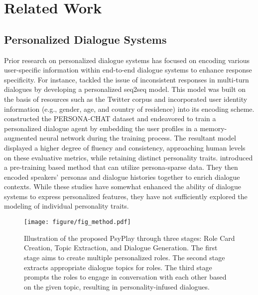\section{Related Work}
\subsection{Personalized Dialogue Systems}
Prior research on personalized dialogue systems has focused on encoding various user-specific information within end-to-end dialogue systems to enhance response specificity. For instance, \citet{li2016persona} tackled the issue of inconsistent responses in multi-turn dialogues by developing a personalized seq2seq %
model. This model was built on the basis of resources such as the Twitter corpus and incorporated user identity information (e.g., gender, age, and country of residence) into its encoding scheme. \citet{zhang2018personalizing} constructed the PERSONA-CHAT dataset and endeavored to train a personalized dialogue agent by embedding the user profiles in a memory-augmented neural network \cite{sukhbaatar2015end} during the training process. The resultant model displayed a higher degree of fluency and consistency, approaching human levels on these evaluative metrics, while retaining distinct personality traits. \citet{zheng2020pre} introduced a pre-training based method that can utilize persona-sparse data. They then encoded speakers’ personas and dialogue histories together to enrich dialogue contexts. While these studies have somewhat enhanced the ability of dialogue systems to express personalized features, they have not sufficiently explored the modeling of individual personality traits.

\begin{figure*}[t]
	\centering
	\texttt{[image: figure/fig\_method.pdf]}
	\caption{Illustration of the proposed PsyPlay through three stages: Role Card Creation, Topic Extraction, and Dialogue Generation. The first stage aims to create multiple personalized roles. The second stage extracts appropriate dialogue topics for roles. The third stage prompts the roles to engage in conversation with each other based on the given topic, resulting in personality-infused dialogues.}
	\label{fig:method}
\vspace{-3mm}
\end{figure*}

